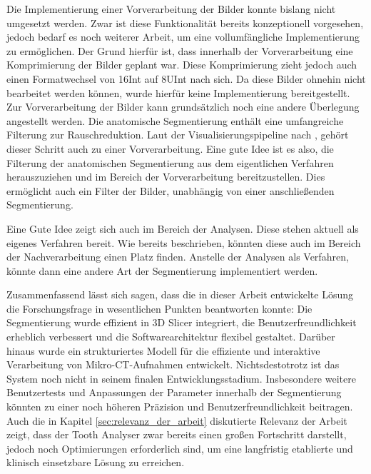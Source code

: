 Die Implementierung einer Vorverarbeitung der Bilder konnte bislang nicht
umgesetzt werden. Zwar ist diese Funktionalität bereits konzeptionell vorgesehen,
jedoch bedarf es noch weiterer Arbeit, um eine vollumfängliche Implementierung zu
ermöglichen. Der Grund hierfür ist, dass innerhalb der Vorverarbeitung eine Komprimierung
der Bilder geplant war. Diese Komprimierung zieht jedoch auch einen
Formatwechsel von \ac{16Int} auf \ac{8UInt} nach sich. Da diese Bilder ohnehin nicht
bearbeitet werden können, wurde hierfür keine Implementierung bereitgestellt. Zur
Vorverarbeitung der Bilder kann grundsätzlich noch eine andere Überlegung angestellt
werden. Die anatomische Segmentierung enthält eine umfangreiche Filterung zur
Rauschreduktion. Laut der Visualisierungspipeline nach \citet[S.~50]{handels2000},
gehört dieser Schritt auch zu einer Vorverarbeitung. Eine gute Idee ist es also,
die Filterung der anatomischen Segmentierung aus dem eigentlichen Verfahren herauszuziehen
und im Bereich der Vorverarbeitung bereitzustellen. Dies ermöglicht auch ein
Filter der Bilder, unabhängig von einer anschließenden Segmentierung.

Eine Gute Idee zeigt sich auch im Bereich der Analysen. Diese stehen aktuell als
eigenes Verfahren bereit. Wie bereits beschrieben, könnten diese auch im Bereich
der Nachverarbeitung einen Platz finden. Anstelle der Analysen als Verfahren,
könnte dann eine andere Art der Segmentierung implementiert werden.

Zusammenfassend lässt sich sagen, dass die in dieser Arbeit entwickelte Lösung die
Forschungsfrage in wesentlichen Punkten beantworten konnte: Die Segmentierung
wurde effizient in 3D Slicer integriert, die Benutzerfreundlichkeit erheblich verbessert
und die Softwarearchitektur flexibel gestaltet. Darüber hinaus wurde ein
strukturiertes Modell für die effiziente und interaktive Verarbeitung von Mikro-\ac{CT}-Aufnahmen
entwickelt. Nichtsdestotrotz ist das System noch nicht in seinem finalen
Entwicklungsstadium. Insbesondere weitere Benutzertests und Anpassungen der Parameter
innerhalb der Segmentierung könnten zu einer noch höheren Präzision und Benutzerfreundlichkeit
beitragen. Auch die in Kapitel \ref{sec:relevanz_der_arbeit} diskutierte
Relevanz der Arbeit zeigt, dass der Tooth Analyser zwar bereits einen großen Fortschritt
darstellt, jedoch noch Optimierungen erforderlich sind, um eine langfristig etablierte
und klinisch einsetzbare Lösung zu erreichen.
